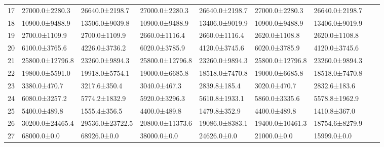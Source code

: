 \begin{tabular}{|r|l|l|l|l|l|l|l|l|}
  17 & 27000.0±2280.3 & 26640.0±2198.7 & 27000.0±2280.3 & 26640.0±2198.7 & 27000.0±2280.3 & 26640.0±2198.7 \\ 
  18 & 10900.0±9488.9 & 13506.0±9039.8 & 10900.0±9488.9 & 13406.0±9019.9 & 10900.0±9488.9 & 13406.0±9019.9 \\ 
  19 & 2700.0±1109.9 & 2700.0±1109.9 & 2660.0±1116.4 & 2660.0±1116.4 & 2620.0±1108.8 & 2620.0±1108.8 \\ 
  20 & 6100.0±3765.6 & 4226.0±3736.2 & 6020.0±3785.9 & 4120.0±3745.6 & 6020.0±3785.9 & 4120.0±3745.6 \\ 
  21 & 25800.0±12796.8 & 23260.0±9894.3 & 25800.0±12796.8 & 23260.0±9894.3 & 25800.0±12796.8 & 23260.0±9894.3 \\ 
  22 & 19800.0±5591.0 & 19918.0±5754.1 & 19000.0±6685.8 & 18518.0±7470.8 & 19000.0±6685.8 & 18518.0±7470.8 \\ 
  23 & 3380.0±470.7 & 3217.6±350.4 & 3040.0±467.3 & 2839.8±185.4 & 3020.0±470.7 & 2832.6±183.6 \\ 
  24 & 6080.0±3257.2 & 5774.2±1832.9 & 5920.0±3296.3 & 5610.8±1933.1 & 5860.0±3335.6 & 5578.8±1962.9 \\ 
  25 & 5400.0±489.8 & 1555.4±356.5 & 4400.0±489.8 & 1479.8±352.9 & 4400.0±489.8 & 1410.8±367.0 \\ 
  26 & 30200.0±24465.4 & 29536.0±23722.5 & 20800.0±11373.6 & 19086.0±8383.1 & 19400.0±10461.3 & 18754.6±8279.9 \\ 
  27 & 68000.0±0.0 & 68926.0±0.0 & 38000.0±0.0 & 24626.0±0.0 & 21000.0±0.0 & 15999.0±0.0 \\ 
\end{tabular}
